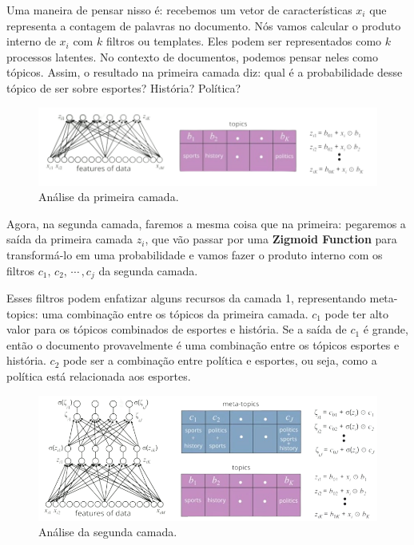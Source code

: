 \documentclass[11pt, a4paper]{article}
\begin{document}
Uma maneira de pensar nisso é: recebemos um vetor de características $x_i$ que representa a contagem de palavras no documento. Nós vamos calcular o produto interno de $x_i$ com $k$ filtros ou templates. Eles podem ser representados como $k$ processos latentes. No contexto de documentos, podemos pensar neles como tópicos. Assim, o resultado na primeira camada diz: qual é a probabilidade desse tópico de ser sobre esportes? História? Política?

\begin{figure}[h]
\centering
\includegraphics[scale=0.5]{9thMTP}
\caption{Análise da primeira camada.}
\end{figure}

Agora, na segunda camada, faremos a mesma coisa que na primeira: pegaremos a saída da primeira camada $z_i$, que vão passar por uma \textbf{Zigmoid Function} para transformá-lo em uma probabilidade e vamos fazer o produto interno com os filtros  $c_1, \, c_2,\, \cdots \,, c_j$ da segunda camada.

Esses filtros podem enfatizar alguns recursos da camada 1, representando meta-topics: uma combinação entre os tópicos da primeira camada. $c_1$ pode ter alto valor para os tópicos combinados de esportes e história. Se a saída de $c_1$ é grande, então o documento provavelmente é uma combinação entre os tópicos esportes e história. $c_2$ pode ser a combinação entre política e esportes, ou seja, como a política está relacionada aos esportes.

\begin{figure}[h]
\centering
\includegraphics[scale=0.3]{10thMTP}
\caption{Análise da segunda camada.}
\end{figure}
\end{document}
